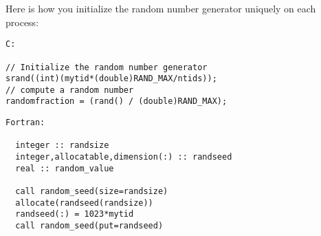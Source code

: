 
Here is how you initialize the random number generator uniquely on each process:

{\footnotesize
\begin{verbatim}
C:

// Initialize the random number generator
srand((int)(mytid*(double)RAND_MAX/ntids));
// compute a random number
randomfraction = (rand() / (double)RAND_MAX);
\end{verbatim}
\begin{verbatim}
Fortran:

  integer :: randsize
  integer,allocatable,dimension(:) :: randseed
  real :: random_value

  call random_seed(size=randsize)
  allocate(randseed(randsize))
  randseed(:) = 1023*mytid
  call random_seed(put=randseed)
\end{verbatim}
}

